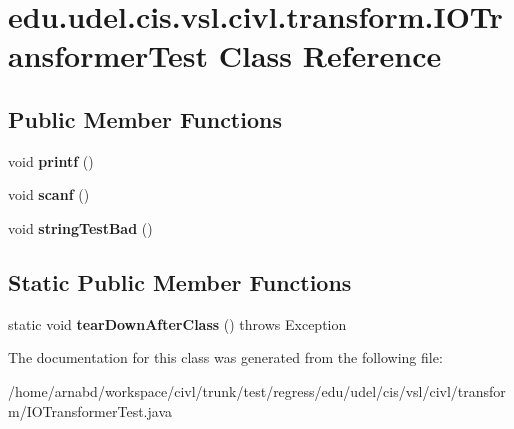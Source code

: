 \hypertarget{classedu_1_1udel_1_1cis_1_1vsl_1_1civl_1_1transform_1_1IOTransformerTest}{}\section{edu.\+udel.\+cis.\+vsl.\+civl.\+transform.\+I\+O\+Transformer\+Test Class Reference}
\label{classedu_1_1udel_1_1cis_1_1vsl_1_1civl_1_1transform_1_1IOTransformerTest}
\subsection*{Public Member Functions}
\begin{DoxyCompactItemize}
\item 
\hypertarget{classedu_1_1udel_1_1cis_1_1vsl_1_1civl_1_1transform_1_1IOTransformerTest_af437f57c70c1ffd52d0ced273fdb620b}{}void {\bfseries printf} ()\label{classedu_1_1udel_1_1cis_1_1vsl_1_1civl_1_1transform_1_1IOTransformerTest_af437f57c70c1ffd52d0ced273fdb620b}

\item 
\hypertarget{classedu_1_1udel_1_1cis_1_1vsl_1_1civl_1_1transform_1_1IOTransformerTest_ac323b685c0eefa64f38da14f7a222a6e}{}void {\bfseries scanf} ()\label{classedu_1_1udel_1_1cis_1_1vsl_1_1civl_1_1transform_1_1IOTransformerTest_ac323b685c0eefa64f38da14f7a222a6e}

\item 
\hypertarget{classedu_1_1udel_1_1cis_1_1vsl_1_1civl_1_1transform_1_1IOTransformerTest_a712b3ddb395cf259bcb9ac023f9a4a26}{}void {\bfseries string\+Test\+Bad} ()\label{classedu_1_1udel_1_1cis_1_1vsl_1_1civl_1_1transform_1_1IOTransformerTest_a712b3ddb395cf259bcb9ac023f9a4a26}

\end{DoxyCompactItemize}
\subsection*{Static Public Member Functions}
\begin{DoxyCompactItemize}
\item 
\hypertarget{classedu_1_1udel_1_1cis_1_1vsl_1_1civl_1_1transform_1_1IOTransformerTest_a13794f7b10bcfe98d983b1ca85fbd5c1}{}static void {\bfseries tear\+Down\+After\+Class} ()  throws Exception \label{classedu_1_1udel_1_1cis_1_1vsl_1_1civl_1_1transform_1_1IOTransformerTest_a13794f7b10bcfe98d983b1ca85fbd5c1}

\end{DoxyCompactItemize}


The documentation for this class was generated from the following file\+:\begin{DoxyCompactItemize}
\item 
/home/arnabd/workspace/civl/trunk/test/regress/edu/udel/cis/vsl/civl/transform/I\+O\+Transformer\+Test.\+java\end{DoxyCompactItemize}
